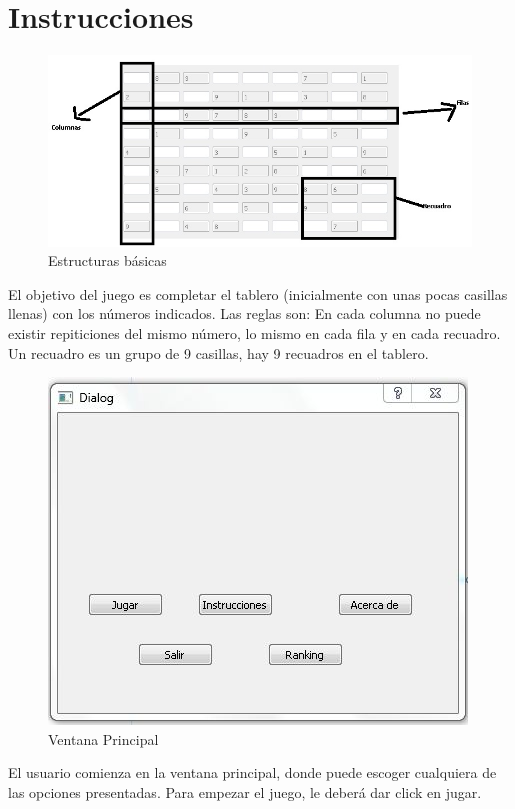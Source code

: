 \section{Instrucciones}

\begin{figure}[htbp]
\begin{center}
\includegraphics[width=.60\textwidth]{./imagenes/6.jpg}
\caption{Estructuras básicas}
\label{Estructuras básicas}
\end{center}
\end{figure}


El objetivo del juego es completar el tablero (inicialmente con unas pocas casillas llenas) con los números indicados. 
Las reglas son: En cada columna no puede existir  repiticiones del mismo número, lo mismo en cada fila y en cada recuadro.
Un recuadro es un grupo de 9 casillas, hay 9 recuadros en el tablero.

\newpage
\begin{figure}[htbp]
\begin{center}
\includegraphics[width=.60\textwidth]{./imagenes/1.jpg}
\caption{Ventana Principal}
\label{Ventana Principal}
\end{center}
\end{figure}
El usuario comienza en la ventana principal, donde puede escoger cualquiera de las opciones presentadas. Para empezar el juego, le deberá dar click en jugar.

